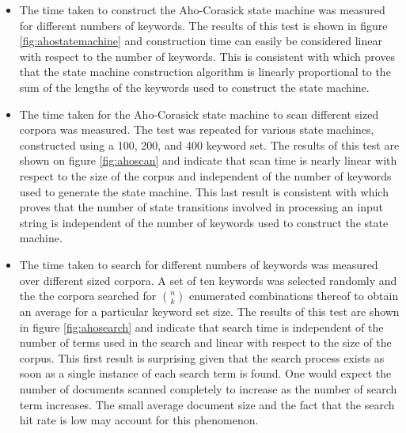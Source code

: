 \documentclass[10pt]{report}
\begin{document}
\begin{itemize}
\item The time taken to construct the Aho-Corasick state machine was
  measured for different numbers of keywords. The results of this test
  is shown in figure \ref{fig:ahostatemachine} and construction time
  can easily be considered linear with respect to the number of
  keywords. This is consistent with \cite{RefWorks:103} which proves
  that the state machine construction algorithm is linearly
  proportional to the sum of the lengths of the keywords used to
  construct the state machine.

\item The time taken for the Aho-Corasick state machine to scan
  different sized corpora was measured. The test was repeated for
  various state machines, constructed using a 100, 200, and 400
  keyword set. The results of this test are shown on figure
  \ref{fig:ahoscan} and indicate that scan time is nearly linear with
  respect to the size of the corpus and independent of the number of
  keywords used to generate the state machine. This last result is
  consistent with \cite{RefWorks:103} which proves that the number of
  state transitions involved in processing an input string is
  independent of the number of keywords used to construct the state
  machine.

\item The time taken to search for different numbers of keywords was
  measured over different sized corpora. A set of ten keywords was
  selected randomly and the the corpora searched for ${n \choose k}$
  enumerated combinations thereof to obtain an average for a
  particular keyword set size. The results of this test are shown in
  figure \ref{fig:ahosearch} and indicate that search time is
  independent of the number of terms used in the search and linear
  with respect to the size of the corpus. This first result is
  surprising given that the search process exists as soon as a single
  instance of each search term is found. One would expect the number
  of documents scanned completely to increase as the number of search
  term increases. The small average document size and the fact that
  the search hit rate is low may account for this phenomenon.
\end{itemize}
\end{document}
